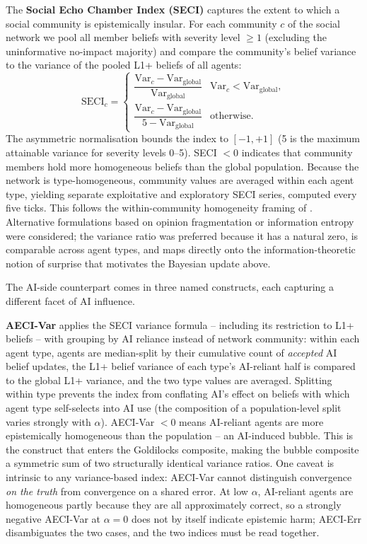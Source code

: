 \documentclass[pdflatex,sn-basic]{sn-jnl}
\begin{document}
The \textbf{Social Echo Chamber Index (SECI)} captures the extent to which a social community is epistemically insular. For each community $c$ of the social network we pool all member beliefs with severity level $\geq 1$ (excluding the uninformative no-impact majority) and compare the community's belief variance to the variance of the pooled L1+ beliefs of all agents:
\begin{equation}
\text{SECI}_c =
\begin{cases}
\dfrac{\text{Var}_c - \text{Var}_{\text{global}}}{\text{Var}_{\text{global}}} & \text{Var}_c < \text{Var}_{\text{global}}, \\[2ex]
\dfrac{\text{Var}_c - \text{Var}_{\text{global}}}{5 - \text{Var}_{\text{global}}} & \text{otherwise}.
\end{cases}
\label{eq:seci}
\end{equation}
The asymmetric normalisation bounds the index to $[-1, +1]$ (5 is the maximum attainable variance for severity levels 0--5). SECI $< 0$ indicates that community members hold more homogeneous beliefs than the global population. Because the network is type-homogeneous, community values are averaged within each agent type, yielding separate exploitative and exploratory SECI series, computed every five ticks. This follows the within-community homogeneity framing of \citet{cinelli2021echo}.
Alternative formulations based on opinion fragmentation \citep{bail2018exposure} or information entropy \citep{sasahara2021social}
were considered; the variance ratio was preferred because it has a natural zero, is comparable across agent types, and maps directly onto the information-theoretic notion of surprise that motivates the Bayesian update above.

The AI-side counterpart comes in three named constructs, each capturing a different facet of AI influence.

\textbf{AECI-Var} applies the SECI variance formula -- including its restriction to L1+ beliefs -- with grouping by AI reliance instead of network community: within each agent type, agents are median-split by their cumulative count of \emph{accepted} AI belief updates, the L1+ belief variance of each type's AI-reliant half is compared to the global L1+ variance, and the two type values are averaged. Splitting within type prevents the index from conflating AI's effect on beliefs with which agent type self-selects into AI use (the composition of a population-level split varies strongly with $\alpha$). AECI-Var $< 0$ means AI-reliant agents are more epistemically homogeneous than the population -- an AI-induced bubble. This is the construct that enters the Goldilocks composite, making the bubble composite a symmetric sum of two structurally identical variance ratios. One caveat is intrinsic to any variance-based index: AECI-Var cannot distinguish convergence \emph{on the truth} from convergence on a shared error. At low $\alpha$, AI-reliant agents are homogeneous partly because they are all approximately correct, so a strongly negative AECI-Var at $\alpha = 0$ does not by itself indicate epistemic harm; AECI-Err disambiguates the two cases, and the two indices must be read together.
\end{document}
